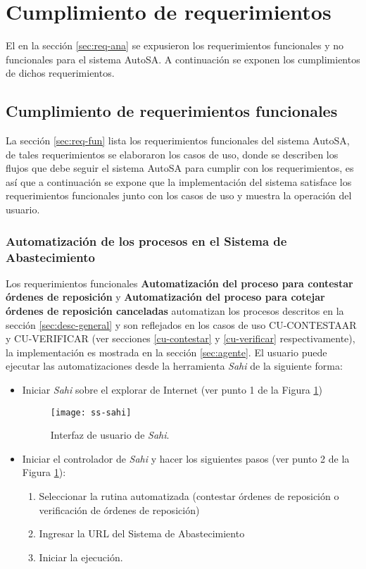 \section{Cumplimiento de requerimientos}
El en la sección \ref{sec:req-ana} se expusieron los requerimientos funcionales y no funcionales para el sistema AutoSA. A continuación se exponen los cumplimientos de dichos requerimientos.

\subsection{Cumplimiento de requerimientos funcionales}
La sección \ref{sec:req-fun} lista los requerimientos funcionales del sistema AutoSA, de tales requerimientos se elaboraron los casos de uso, donde se describen los flujos que debe seguir el sistema AutoSA para cumplir con los requerimientos, es así que a continuación se expone que la implementación del sistema satisface los requerimientos funcionales junto con los casos de uso y muestra la operación del usuario.

\subsubsection{Automatización de los procesos en el Sistema de Abastecimiento}
Los requerimientos funcionales \textbf{Automatización del proceso para contestar órdenes de reposición} y \textbf{Automatización del proceso para cotejar órdenes de reposición canceladas} automatizan los procesos descritos en la sección \ref{sec:desc-general} y son reflejados en los casos de uso CU-CONTESTAAR y CU-VERIFICAR (ver secciones \ref{cu-contestar} y \ref{cu-verificar} respectivamente), la implementación es mostrada en la sección \ref{sec:agente}. El usuario puede ejecutar las automatizaciones desde la herramienta \textit{Sahi} de la siguiente forma:
\begin{itemize}
	\item Iniciar \textit{Sahi} sobre el explorar de Internet (ver punto 1 de la Figura \ref{fig:ss-sahi})
	\begin{figure}[h]
		\centering
		\texttt{[image: ss-sahi]}
		\caption{Interfaz de usuario de \textit{Sahi}.}
		\label{fig:ss-sahi}
	\end{figure}

	\item Iniciar el controlador de \textit{Sahi} y hacer los siguientes pasos (ver punto 2 de la Figura \ref{fig:ss-sahi}):
	\begin{enumerate}
		\item Seleccionar la rutina automatizada (contestar órdenes de reposición o verificación de órdenes de reposición)
		\item Ingresar la URL del Sistema de Abastecimiento
		\item Iniciar la ejecución.
	\end{enumerate}
\end{itemize}

